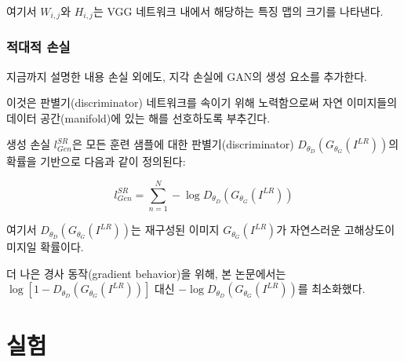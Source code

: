 \documentclass[10pt,twocolumn,letterpaper]{article}
\newcommand{\kor}[1]{#1}
\newcommand{\eng}[1]{}
\begin{document}
\eng{
Here $W_{i,j}$ and $H_{i,j}$ describe the dimensions of the respective feature maps within the VGG network.
}\kor{
여기서 $W_{i,j}$와 $H_{i,j}$는 VGG 네트워크 내에서 해당하는 특징 맵의 크기를 나타낸다.
}

\subsubsection{\eng{Adversarial loss}\kor{적대적 손실}}
\eng{
In addition to the content losses described so far, we also add the generative component of our \ac{GAN} to the perceptual loss.
}\kor{
지금까지 설명한 내용 손실 외에도, 지각 손실에 \ac{GAN}의 생성 요소를 추가한다.
} \eng{
This encourages our network to favor solutions that reside on the manifold of natural images, by trying to fool the discriminator network.
}\kor{
이것은 판별기(discriminator) 네트워크를 속이기 위해 노력함으로써 자연 이미지들의 데이터 공간(manifold)에 있는 해를 선호하도록 부추긴다.
} \eng{
The generative loss $l^{SR}_{Gen}$ is defined based on the probabilities of the discriminator $D_{\theta_D}(G_{\theta_G}(I^{LR}))$ over all training samples as:
}\kor{
생성 손실 $l^{SR}_{Gen}$은 모든 훈련 샘플에 대한 판별기(discriminator) $D_{\theta_D}(G_{\theta_G}(I^{LR}))$의 확률을 기반으로 다음과 같이 정의된다:
}
\begin{equation}
l^{SR}_{Gen} = \sum_{n=1}^{N} -\log D_{\theta_D}(G_{\theta_G}(I^{LR}))
\end{equation}

\eng{
Here, $D_{\theta_D}(G_{\theta_G}(I^{LR}))$ is the probability that the reconstructed image $G_{\theta_G}(I^{LR})$ is a natural HR image.
}\kor{
여기서 $D_{\theta_D}(G_{\theta_G}(I^{LR}))$는 재구성된 이미지 $G_{\theta_G}(I^{LR})$가 자연스러운 고해상도이미지일 확률이다.
} \eng{
For better gradient behavior we minimize $-\log D_{\theta_D}(G_{\theta_G}(I^{LR}))$ instead of $\log [1-D_{\theta_D}(G_{\theta_G}(I^{LR}))]$ \cite{Goodfellow14GAN}.
}\kor{
더 나은 경사 동작(gradient behavior)을 위해, 본 논문에서는 $\log [1-D_{\theta_D}(G_{\theta_G}(I^{LR}))]$ \cite{Goodfellow14GAN} 대신 $-\log D_{\theta_D}(G_{\theta_G}(I^{LR}))$를 최소화했다.
}

%
\section{\eng{Experiments}\kor{실험}}
\label{sec:experiments}
\end{document}
